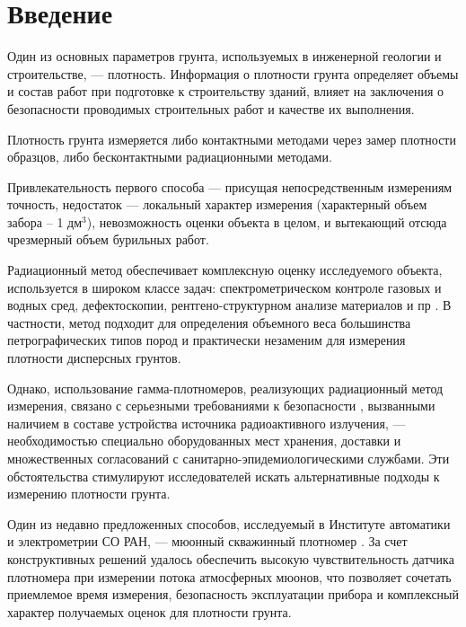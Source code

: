 \chapter*{Введение}							%

Один из основных параметров грунта, используемых в инженерной геологии и строительстве, ---
плотность. Информация о плотности грунта 
определяет объемы и состав работ при подготовке к строительству зданий, влияет на заключения о 
безопасности проводимых строительных работ и качестве их выполнения\cite{gost5180, souzdornii}. 

Плотность грунта измеряется либо контактными методами через замер плотности образцов, 
либо бесконтактными радиационными методами.

Привлекательность первого способа --- присущая непосредственным измерениям точность, недостаток ---
локальный характер измерения (характерный объем забора – 1 дм$^{3}$), невозможность оценки объекта в целом,
и вытекающий отсюда чрезмерный объем бурильных работ.

Радиационный метод обеспечивает комплексную оценку исследуемого объекта, используется в широком классе задач:
спектрометрическом контроле газовых и водных сред, дефектоскопии, рентгено-структурном анализе материалов и пр \cite{gammaquant}. 
В частности, метод подходит для определения объемного веса большинства петрографических типов пород и практически 
незаменим для измерения плотности дисперсных грунтов. 

Однако, использование гамма-плотномеров, реализующих радиационный метод измерения, связано с серьезными требованиями 
к безопасности \cite{gost23061}, вызванными наличием в составе устройства источника радиоактивного излучения, --- необходимостью 
специально оборудованных мест хранения, доставки и множественных согласований с санитарно-эпидемиологическими службами. 
Эти обстоятельства стимулируют исследователей искать альтернативные подходы к измерению плотности грунта. 

Один из недавно предложенных способов, исследуемый в Институте автоматики и электрометрии СО РАН, ---
мюонный скважинный плотномер \cite{patentdensitometer}. За счет конструктивных решений удалось обеспечить высокую чувствительность 
датчика плотномера при измерении потока атмосферных мюонов, что позволяет сочетать приемлемое время измерения, 
безопасность эксплуатации прибора и комплексный характер получаемых оценок для плотности грунта.

